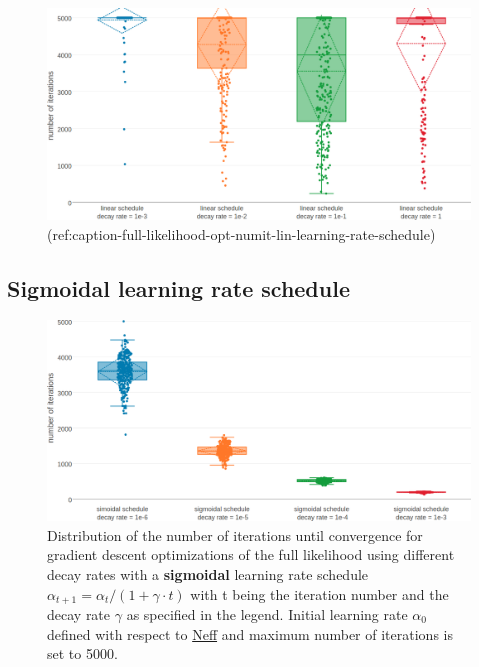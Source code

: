 \documentclass[11pt,a4paper,twoside]{book}
\theoremstyle{definition}
\theoremstyle{definition}
\theoremstyle{remark}
\begin{document}
\begin{figure}

{\centering \includegraphics[width=0.9\linewidth]{img/full_likelihood/appendix/distribution_numiterations_against_linear_learningrate_schedule} 

}

\caption{(ref:caption-full-likelihood-opt-numit-lin-learning-rate-schedule)}\label{fig:full-likelihood-opt-numit-lin-learning-rate-schedule}
\end{figure}

\subsection{Sigmoidal learning rate
schedule}\label{sigmoidal-learning-rate-schedule-1}











\begin{figure}

{\centering \includegraphics[width=1\linewidth]{img/full_likelihood/appendix/distribution_numiterations_against_sigmoidal_learningrate_schedule} 

}

\caption{Distribution
of the number of iterations until convergence for gradient descent
optimizations of the full likelihood using different decay rates with a
\textbf{sigmoidal} learning rate schedule
\(\alpha_{t+1} = \alpha_{t} / (1 + \gamma \cdot t)\) with t being the
iteration number and the decay rate \(\gamma\) as specified in the
legend. Initial learning rate \(\alpha_0\) defined with respect to
\protect\hyperlink{abbrev}{Neff} and maximum number of iterations is set
to 5000.}\label{fig:numit-convergence-sig-learning-rate-schedule}
\end{figure}
\end{document}
